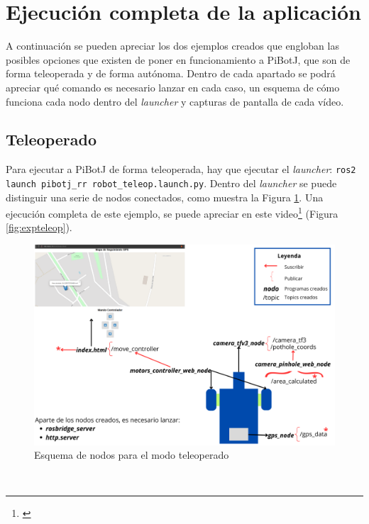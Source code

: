 

\section{Ejecución completa de la aplicación}
\label{sec:expcompleto}
A continuación se pueden apreciar los dos ejemplos creados que engloban las posibles opciones que existen de poner en funcionamiento a PiBotJ, que son de forma teleoperada y de forma autónoma. Dentro de cada apartado se podrá apreciar qué comando es necesario lanzar en cada caso, un esquema de cómo funciona cada nodo dentro del \textit{launcher} y capturas de pantalla de cada vídeo.

\subsection{Teleoperado}

Para ejecutar a PiBotJ de forma teleoperada, hay que ejecutar el \textit{launcher}: \verb|ros2 launch pibotj_rr robot_teleop.launch.py|. Dentro del \textit{launcher} se puede distinguir una serie de nodos conectados, como muestra la Figura \ref{fig:nodosteleop}. Una ejecución completa de este ejemplo, se puede apreciar en este video\footnote{\url{}} (Figura \ref{fig:expteleop}). 

\begin{figure} [h!]
	\begin{center}
			\includegraphics[width=15cm]{figs/cap7/esquema_nodos_teleop_ampliado.png}
		\end{center}
	\caption{Esquema de nodos para el modo teleoperado}
	\label{fig:nodosteleop}
\end{figure}\
 
